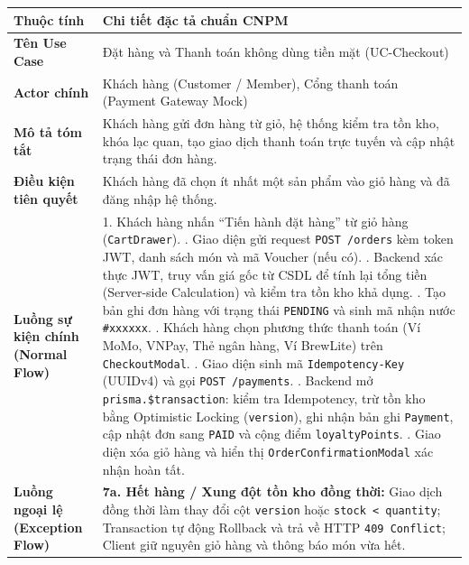 \documentclass[a4paper,12pt]{article}
\begin{document}
\begin{table}[h!]
\centering
\small
\begin{tabularx}{\textwidth}{|p{3.5cm}|X|}
\hline
\textbf{Thuộc tính} & \textbf{Chi tiết đặc tả chuẩn CNPM} \\
\hline
\textbf{Tên Use Case} & Đặt hàng và Thanh toán không dùng tiền mặt (UC-Checkout) \\
\hline
\textbf{Actor chính} & Khách hàng (Customer / Member), Cổng thanh toán (Payment Gateway Mock) \\
\hline
\textbf{Mô tả tóm tắt} & Khách hàng gửi đơn hàng từ giỏ, hệ thống kiểm tra tồn kho, khóa lạc quan, tạo giao dịch thanh toán trực tuyến và cập nhật trạng thái đơn hàng. \\
\hline
\textbf{Điều kiện tiên quyết} & Khách hàng đã chọn ít nhất một sản phẩm vào giỏ hàng và đã đăng nhập hệ thống. \\
\hline
\textbf{Luồng sự kiện chính (Normal Flow)} & 
1. Khách hàng nhấn ``Tiến hành đặt hàng'' từ giỏ hàng (\texttt{CartDrawer}). \newline
2. Giao diện gửi request \texttt{POST /orders} kèm token JWT, danh sách món và mã Voucher (nếu có). \newline
3. Backend xác thực JWT, truy vấn giá gốc từ CSDL để tính lại tổng tiền (Server-side Calculation) và kiểm tra tồn kho khả dụng. \newline
4. Tạo bản ghi đơn hàng với trạng thái \texttt{PENDING} và sinh mã nhận nước \texttt{\#xxxxxx}. \newline
5. Khách hàng chọn phương thức thanh toán (Ví MoMo, VNPay, Thẻ ngân hàng, Ví BrewLite) trên \texttt{CheckoutModal}. \newline
6. Giao diện sinh mã \texttt{Idempotency-Key} (UUIDv4) và gọi \texttt{POST /payments}. \newline
7. Backend mở \texttt{prisma.\$transaction}: kiểm tra Idempotency, trừ tồn kho bằng Optimistic Locking (\texttt{version}), ghi nhận bản ghi \texttt{Payment}, cập nhật đơn sang \texttt{PAID} và cộng điểm \texttt{loyaltyPoints}. \newline
8. Giao diện xóa giỏ hàng và hiển thị \texttt{OrderConfirmationModal} xác nhận hoàn tất. \\
\hline
\textbf{Luồng ngoại lệ (Exception Flow)} & 
\textbf{7a. Hết hàng / Xung đột tồn kho đồng thời:} Giao dịch đồng thời làm thay đổi cột \texttt{version} hoặc \texttt{stock < quantity}; Transaction tự động Rollback và trả về HTTP \texttt{409 Conflict}; Client giữ nguyên giỏ hàng và thông báo món vừa hết. \newline

\end{tabularx}
\end{table}
\end{document}
